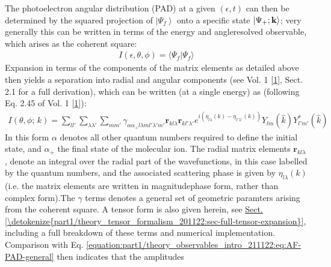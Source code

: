 \documentclass[letterpaper,table,10pt,english]{jupyterBook}
\begin{document}
\sphinxAtStartPar
The photoelectron angular distribution (PAD) at a given \((\epsilon,t)\)
can then be determined by the squared projection of
\(\left|\Psi_f\right>\) onto a specific state
\(\left|\Psi_{+};\bf{k}\right>\); very generally this can be written in terms of the energy and angle\sphinxhyphen{}resolved observable, which arises as the coherent square:
\begin{equation}\label{equation:part1/theory_photoionization_dynamics_191122:eq:matE-sq-general}
\begin{split}
I(\epsilon,\theta,\phi)=\langle\Psi_{f}|\Psi_{f}\rangle
\end{split}
\end{equation}
\sphinxAtStartPar
Expansion in terms of the components of the matrix elements as detailed above then yields a separation into radial and angular components (see  Vol. 1 {[}\hyperlink{cite.backmatter/bibliography:id569}{1}{]}, Sect. 2.1 for a full derivation), which can be written (at a single energy) as (following Eq. 2.45 of  Vol. 1 {[}\hyperlink{cite.backmatter/bibliography:id569}{1}{]}):
\begin{equation}\label{equation:part1/theory_photoionization_dynamics_191122:eq:I-reduced-LF-2_45-vol1}
\begin{split}
I(\theta,\phi;\,k)=\sum_{ll'}\sum_{\lambda\lambda'}\sum_{mm'}\gamma_{\alpha\alpha_{+}l\lambda ml'\lambda'm'}\boldsymbol{r}_{kl\lambda}\boldsymbol{r}_{kl'\lambda'}e^{i(\eta_{l\lambda}(k)-\eta_{l'\lambda'}(k))}Y_{lm}(\hat{k})Y_{l'm'}^{*}(\hat{k})
\end{split}
\end{equation}
\sphinxAtStartPar
In this form \(\alpha\) denotes all other quantum numbers required to define the initial state, and \(\alpha_{+}\) the final state of the molecular ion. The radial matrix elements \(\boldsymbol{r}_{kl\lambda}\), denote an integral over the radial part of the wavefunctions, in this case labelled by the {\hyperref[\detokenize{backmatter/glossary:term-MF}]{}} quantum numbers, and the associated scattering phase is given by \(\eta_{l\lambda}(k)\) (i.e. the matrix elements are written in magnitude\sphinxhyphen{}phase form, rather than complex form).The \(\gamma\) terms denotes a general set of geometric paramters arising from the coherent square.  A tensor form is also given herein, see \hyperref[\detokenize{part1/theory_tensor_formalism_201122:sec-full-tensor-expansion}]{Sect.\@ \ref{\detokenize{part1/theory_tensor_formalism_201122:sec-full-tensor-expansion}}}, including a full breakdown of these terms and numerical implementation. Comparison with Eq. \eqref{equation:part1/theory_observables_intro_211122:eq:AF-PAD-general} then indicates that the amplitudes
\end{document}
